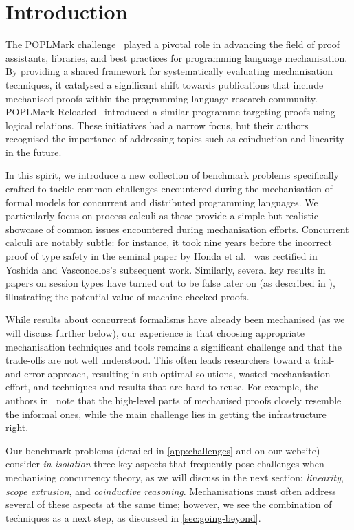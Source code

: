 \documentclass[runningheads]{llncs}
\begin{document}
\section{Introduction}
The POPLMark challenge~\cite{POPLMark}
played a pivotal role in advancing the field of proof assistants,
libraries, and best practices for programming language
mechanisation. By providing a shared framework for systematically
evaluating mechanisation techniques, it catalysed a significant
shift towards publications that include mechanised proofs within the programming language research community.
POPLMark Reloaded~\cite{POPLMarkReloaded} introduced a similar programme targeting proofs using logical relations.
These initiatives had a narrow focus, but their authors recognised the importance of addressing topics such as coinduction and linearity in the future.

In this spirit, we introduce a new collection of benchmark problems
specifically crafted to tackle common challenges encountered during
the mechanisation of formal models for concurrent and distributed
programming languages.
We particularly focus on process calculi as these provide a simple but
realistic showcase of common issues encountered during mechanisation
efforts.
Concurrent calculi are notably subtle: for instance, it took nine
years before the incorrect proof of type safety in the seminal paper
by Honda et al.~\cite{Honda1998} was rectified in Yoshida and
Vasconcelos’s subsequent work\cite{Yoshida2007}.
Similarly, several key results in papers on session types have turned out
to be false later on (as described in \eg \cite{Gay2020,10.1145/3290343}), illustrating the potential
value of machine-checked proofs.

While results about concurrent
formalisms have already been mechanised (as we will discuss further
below), our experience is that choosing appropriate mechanisation
techniques and tools remains a significant challenge and that the
trade-offs are not well understood.  This often leads researchers
toward a trial-and-error approach, resulting in sub-optimal solutions,
wasted mechanisation effort, and techniques and results that are hard
to reuse. For example, the authors in~\cite{Cruz-Filipe2021b} note that the high-level parts of
mechanised proofs closely resemble the informal ones, while the
main challenge lies in getting the infrastructure right.

Our benchmark problems (detailed in \cref{app:challenges} and on our website) consider
\emph{in isolation} three key aspects that frequently pose challenges
when mechanising concurrency theory, as we will discuss in the next section: \emph{linearity}, \emph{scope
  extrusion}, and \emph{coinductive reasoning}.
Mechanisations must often address several of these aspects at the same time; however, we
see the combination of techniques as a next
step, as discussed in \cref{sec:going-beyond}.
\end{document}
